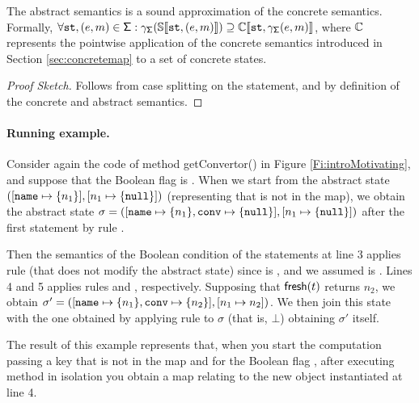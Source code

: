 \begin{lemma}
	\label{lemma:soundnessabstractsemantics}
	The abstract semantics is a sound approximation of the concrete semantics. Formally, $\forall \mathtt{st}, (e, m) \in \mathsf{\Sigma}: \gamma_{\mathsf{\Sigma}}(\mathbb{S}\llbracket \mathtt{st}, (e, m) \rrbracket) \supseteq \mathbb{C}\llbracket \mathtt{st}, \gamma_{\mathsf{\Sigma}}(e, m) \rrbracket$, where $\mathbb{C}$ represents the pointwise application of the concrete semantics introduced in Section \ref{sec:concretemap} to a set of concrete states.
\begin{proof}[Proof Sketch]
Follows from case splitting on the statement, and by definition of the concrete and abstract semantics.
\end{proof}
\end{lemma}

\paragraph{Running example.}
Consider again the code of method {\sf getConvertor()} in Figure \ref{Fi:introMotivating}, and suppose that the Boolean flag  is . When we start from the abstract state  $([\mathtt{name} \mapsto \{n_1\}], [n_1 \mapsto \{\mathtt{null}\}])$ (representing that  is not in the map), we obtain the abstract state $\sigma = ([\mathtt{name} \mapsto \{n_1\}, \mathtt{conv} \mapsto \{\mathtt{null}\}], [n_1 \mapsto \{\mathtt{null}\}])$ after the first statement by rule . 

Then the semantics of the Boolean condition of the  statements at line 3 applies rule  (that does not modify the abstract state) since  is , and we assumed  is . 
Lines 4 and 5 applies rules  and , respectively. Supposing that $\mathsf{fresh}(t)$ returns $n_2$, we obtain $\sigma'=([\mathtt{name} \mapsto \{n_1\}, \mathtt{conv} \mapsto \{n_2\}], [n_1 \mapsto n_2])$. We then join this state with the one obtained by applying rule  to $\sigma$ (that is, $\bot$) obtaining $\sigma'$ itself.

The result of this example represents that, when you start the computation passing a key  that is not in the map and  for the Boolean flag , after executing method  in isolation you obtain a map relating  to the new object instantiated at line 4.

